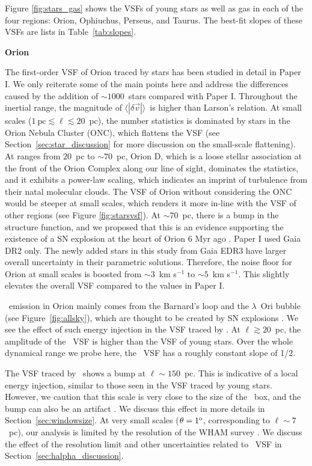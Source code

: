 Figure \ref{fig:stars_gas} shows the VSFs of young stars as well as gas in each of the four regions: Orion, Ophiuchus, Perseus, and Taurus. The best-fit slopes of these VSFs are lists in Table~\ref{tab:slopes}.

\centerline{\textbf{Orion}}

The first-order VSF of Orion traced by stars has been studied in detail in Paper I. We only reiterate some of the main points here and address the differences caused by the addition of $\sim 1000$~stars compared with Paper I. 
Throughout the inertial range, the magnitude of $\langle |\delta \vec{v}| \rangle$~is higher than Larson's relation. At small scales ($1~\mathrm{pc} \lesssim \ell \lesssim 20$~pc), the number statistics is dominated by stars in the Orion Nebula Cluster (ONC), which flattens the VSF (see Section~\ref{sec:star_discussion} for more discussion on the small-scale flattening). 
At ranges from $20$~pc to $\sim 70$~pc, Orion D, which is a loose stellar association at the front of the Orion Complex along our line of sight, dominates the statistics, and it exhibits a power-law scaling, which indicates an imprint of turbulence from their natal molecular clouds. The VSF of Orion without considering the ONC would be steeper at small scales, which renders it more in-line with the VSF of other regions (see Figure \ref{fig:starsvsf}).
At $\sim 70$~pc, there is a bump in the structure function, and we proposed that this is an evidence supporting the existence of a SN explosion at the heart of Orion 6 Myr ago \citep{kounkel_supernovae_2020}.
Paper I used Gaia DR2 only. The newly added stars in this study from Gaia EDR3 have larger overall uncertainty in their parametric solutions. Therefore, the noise floor for Orion at small scales is boosted from $\sim 3$~km s$^{-1}$ to $\sim 5$~km s$^{-1}$. This slightly elevates the overall VSF compared to the values in Paper I.

\halpha~emission in Orion mainly comes from the Barnard's loop and the $\lambda$~Ori bubble (see Figure~\ref{fig:allsky}), which are thought to be created by SN explosions \citep{kounkel_supernovae_2020}. We see the effect of such energy injection in the VSF traced by \halpha. At $\ell \gtrsim 20$~pc, the amplitude of the \halpha~VSF is higher than the VSF of young stars. Over the whole dynamical range we probe here, the \halpha~VSF has a roughly constant slope of 1/2. 

The VSF traced by \halpha~shows a bump at $\ell \sim 150$~pc. This is indicative of a local energy injection, similar to those seen in the VSF traced by young stars. However, we caution that this scale is very close to the size of the \halpha~box, and the bump can also be an artifact \citep[see, e.g.,][]{mohapatra_velocity_2022}. We discuss this effect in more details in Section~\ref{sec:windowsize}. 
At very small scales ($\theta = 1^{\rm o}$, corresponding to $\ell \sim 7$~pc), our analysis is limited by the resolution of the WHAM survey \citep[][]{haffner_wisconsin_2003}. We discuss the effect of the resolution limit and other uncertainties related to \halpha~VSF in Section~\ref{sec:halpha_discussion}.

